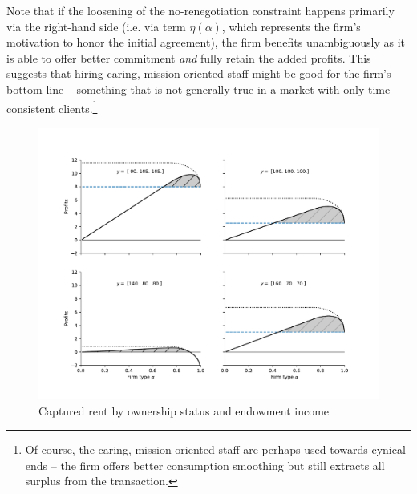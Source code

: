 \documentclass[11pt,english]{article}
\theoremstyle{plain}
\theoremstyle{definition}
\begin{document}
Note that if the loosening of the no-renegotiation constraint
happens primarily via the right-hand side (i.e. via term $\eta\left(\alpha\right)$,
which represents the firm's motivation to honor the initial agreement),
the firm benefits unambiguously as it is able to offer better
commitment \emph{and} fully retain the added profits.
This suggests that hiring caring, mission-oriented staff might be good for the firm's bottom line -- something that is not generally true in a market with only time-consistent clients.\footnote{Of course, the caring, mission-oriented staff are perhaps used towards cynical ends -- the firm offers better consumption smoothing but still extracts all surplus from the transaction.}
\begin{figure}
\includegraphics[scale=0.7]{Figure3.pdf}
\caption{\label{fig:nonprofit}Captured rent by ownership status and endowment
income}
\end{figure}
\end{document}
